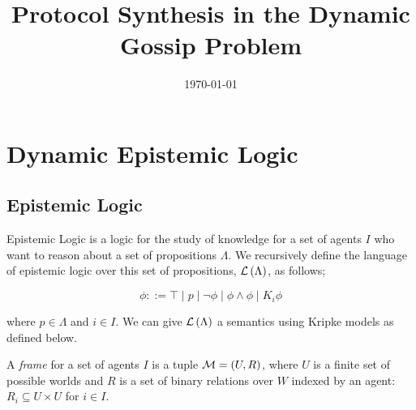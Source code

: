 \documentclass[12pt, a4paper]{article} %
\title{Protocol Synthesis in the Dynamic Gossip Problem} %
\author{
	\authorstyle{Leo Poulson}
	\newline\newline %
}
\date{\today} %
\begin{document}
\maketitle %

\thispagestyle{firstpage} %



\section{Dynamic Epistemic Logic}

\subsection{Epistemic Logic}

Epistemic Logic is a logic for the study of knowledge for a set of agents $I$ who want to reason about a set of propositions $\Lambda$. We recursively define the language of epistemic logic over this set of propositions, $\mathcal{L} \left(\Lambda\right)$, as follows;

\begin{equation}
    \phi ::= \top \mid p \mid \neg \phi \mid \phi \land \phi \mid K_i \phi 
\end{equation}

\noindent where $p \in \Lambda$ and $i \in I$. We can give $\mathcal{L} \left(\Lambda\right)$ a semantics using Kripke models as defined below. 

\hfill

A \textit{frame} for a set of agents $I$ is a tuple $\mathcal{M} = \left(U, R\right)$, where $U$ is a finite set of possible worlds and $R$ is a set of binary relations over $W$ indexed by an agent: $R_i \subseteq U \times U$ for $i \in I$.
\end{document}
